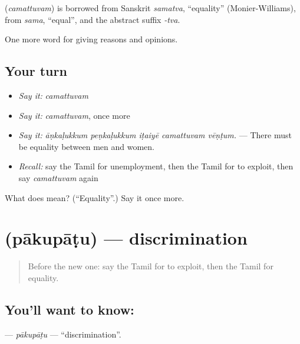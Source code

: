 \begin{cousinweb}
\textbf{} (\emph{camattuvam}) is borrowed from Sanskrit \emph{samatva}, \textquotedblleft{}equality\textquotedblright{} (Monier-Williams), from \emph{sama}, \textquotedblleft{}equal\textquotedblright{}, and the abstract suffix \emph{-tva}.
\end{cousinweb}

\begin{grammarlens}[title={What you've built}]
One more word for giving reasons and opinions.
\end{grammarlens}

\subsection*{Your turn}
\begin{itemize}
\raggedright
  \item \emph{Say it:} \emph{camattuvam}
  \item \emph{Say it:} \emph{camattuvam}, once more
  \item \emph{Say it:} \emph{āṇkaḷukkum peṇkaḷukkum iṭaiyē camattuvam vēṇṭum.} — There must be equality between men and women.
  \item \emph{Recall:} say the Tamil for unemployment, then the Tamil for to exploit, then say \emph{camattuvam} again
\end{itemize}

\begin{tcolorbox}[breakable,colback=teal!4,colframe=teal!35!black,title={Before you move on}]
What does  mean? (\textquotedblleft{}Equality\textquotedblright{}.) Say it once more.
\end{tcolorbox}
\section[\texorpdfstring{\ta{பாகுபாடு} (pākupāṭu)}{பாகுபாடு (pākupāṭu)}]{ (pākupāṭu) — discrimination}

\label{lesson:TA-C371-pakupatu}



\begin{quote}
Before the new one: say the Tamil for to exploit, then the Tamil for equality.
\end{quote}

\subsection*{You'll want to know: }
\textbf{} — \emph{pākupāṭu} — \textquotedblleft{}discrimination\textquotedblright{}.

